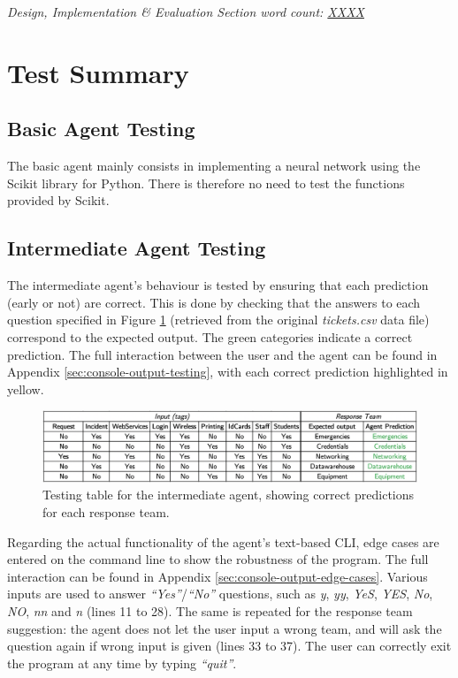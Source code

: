 \documentclass[letterpaper,12pt]{article}
\begin{document}
\textit{Design, Implementation \& Evaluation Section word count: \underline{XXXX}}

\section{Test Summary}
\label{sec:test-summary}

\subsection{Basic Agent Testing}

The basic agent mainly consists in implementing a neural network using the Scikit library for Python. There is therefore no need to test the functions provided by Scikit.

\subsection{Intermediate Agent Testing}

The intermediate agent's behaviour is tested by ensuring that each prediction (early or not) are correct. This is done by checking that the answers to each question specified in Figure \ref{fig:intermediate_testing} (retrieved from the original \textit{tickets.csv} data file) correspond to the expected output. The green categories indicate a correct prediction. The full interaction between the user and the agent can be found in Appendix \ref{sec:console-output-testing}, with each correct prediction highlighted in yellow.

\begin{figure}[h] 
\centerline{\includegraphics[width=\textwidth]{report/figures/intermediate_testing.png}}
\caption{\label{fig:intermediate_testing}Testing table for the intermediate agent, showing correct predictions for each response team.}
\end{figure}

Regarding the actual functionality of the agent's text-based CLI, edge cases are entered on the command line to show the robustness of the program. The full interaction can be found in Appendix \ref{sec:console-output-edge-cases}. Various inputs are used to answer \textit{``Yes''}/\textit{``No''} questions, such as \textit{y}, \textit{yy}, \textit{YeS}, \textit{YES}, \textit{No}, \textit{NO}, \textit{nn} and \textit{n} (lines 11 to 28). The same is repeated for the response team suggestion: the agent does not let the user input a wrong team, and will ask the question again if wrong input is given (lines 33 to 37). The user can correctly exit the program at any time by typing \textit{``quit''}.
\end{document}
